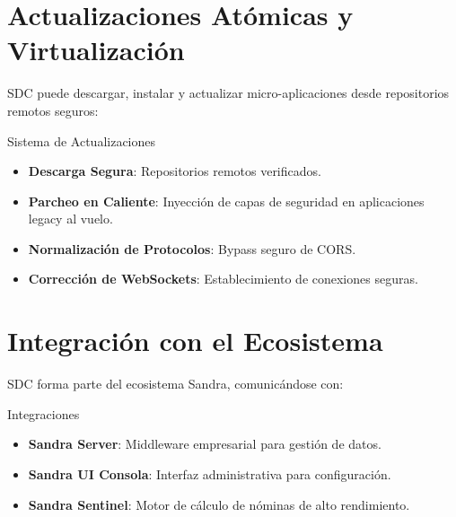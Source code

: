 
\section{Actualizaciones Atómicas y Virtualización}

SDC puede descargar, instalar y actualizar micro-aplicaciones desde repositorios remotos seguros:

\begin{caja}{Sistema de Actualizaciones}
\begin{itemize}
\item \textbf{Descarga Segura}: Repositorios remotos verificados.
\item \textbf{Parcheo en Caliente}: Inyección de capas de seguridad en aplicaciones legacy al vuelo.
\item \textbf{Normalización de Protocolos}: Bypass seguro de CORS.
\item \textbf{Corrección de WebSockets}: Establecimiento de conexiones seguras.
\end{itemize}
\end{caja}


\section{Integración con el Ecosistema}

SDC forma parte del ecosistema Sandra, comunicándose con:

\begin{caja}{Integraciones}
\begin{itemize}
\item \textbf{Sandra Server}: Middleware empresarial para gestión de datos.
\item \textbf{Sandra UI Consola}: Interfaz administrativa para configuración.
\item \textbf{Sandra Sentinel}: Motor de cálculo de nóminas de alto rendimiento.
\end{itemize}
\end{caja}


